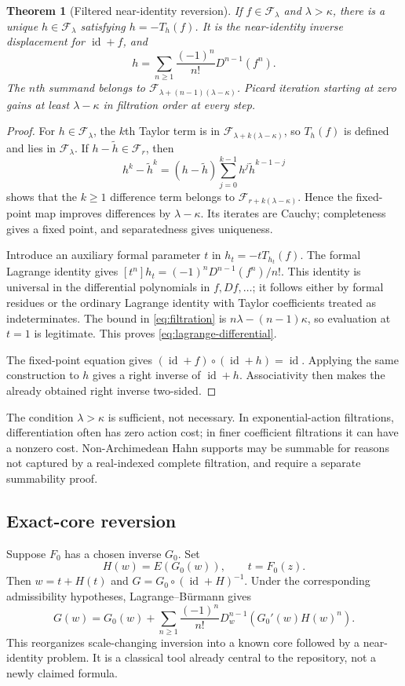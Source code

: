 \documentclass[11pt,a4paper]{article}
\numberwithin{equation}{section}
\newtheorem{theorem}{Theorem}[section]
\theoremstyle{definition}
\theoremstyle{remark}
\newcommand{\id}{\operatorname{id}}
\begin{document}
\begin{theorem}[Filtered near-identity reversion]
\label{thm:filtered}
If $f\in\mathcal F_\lambda$ and $\lambda>\kappa$, there is a unique $h\in\mathcal F_\lambda$ satisfying $h=-T_h(f)$. It is the near-identity inverse displacement for $\id+f$, and
\begin{equation}
 h=\sum_{n\geq1}\frac{(-1)^n}{n!}D^{n-1}(f^n).
 \label{eq:lagrange-differential}
\end{equation}
The $n$th summand belongs to $\mathcal F_{\lambda+(n-1)(\lambda-\kappa)}$. Picard iteration starting at zero gains at least $\lambda-\kappa$ in filtration order at every step.
\end{theorem}
\begin{proof}
For $h\in\mathcal F_\lambda$, the $k$th Taylor term is in
$\mathcal F_{\lambda+k(\lambda-\kappa)}$, so $T_h(f)$ is defined and lies in $\mathcal F_\lambda$. If $h-\widetilde h\in\mathcal F_r$, then
\[
 h^k-\widetilde h^k=(h-\widetilde h)
 \sum_{j=0}^{k-1}h^j\widetilde h^{k-1-j}
\]
shows that the $k\geq1$ difference term belongs to
$\mathcal F_{r+k(\lambda-\kappa)}$. Hence the fixed-point map improves differences by $\lambda-\kappa$. Its iterates are Cauchy; completeness gives a fixed point, and separatedness gives uniqueness.

Introduce an auxiliary formal parameter $t$ in $h_t=-tT_{h_t}(f)$. The formal Lagrange identity gives
$[t^n]h_t=(-1)^nD^{n-1}(f^n)/n!$. This identity is universal in the differential polynomials in $f,Df,\ldots$; it follows either by formal residues or the ordinary Lagrange identity with Taylor coefficients treated as indeterminates. The bound in \eqref{eq:filtration} is
$n\lambda-(n-1)\kappa$, so evaluation at $t=1$ is legitimate. This proves \eqref{eq:lagrange-differential}.

The fixed-point equation gives $(\id+f)\circ(\id+h)=\id$. Applying the same construction to $h$ gives a right inverse of $\id+h$. Associativity then makes the already obtained right inverse two-sided.
\end{proof}

The condition $\lambda>\kappa$ is sufficient, not necessary. In exponential-action filtrations, differentiation often has zero action cost; in finer coefficient filtrations it can have a nonzero cost. Non-Archimedean Hahn supports may be summable for reasons not captured by a real-indexed complete filtration, and require a separate summability proof.

\subsection{Exact-core reversion}
Suppose $F_0$ has a chosen inverse $G_0$. Set
\[
 H(w)=E(G_0(w)),\qquad t=F_0(z).
\]
Then $w=t+H(t)$ and $G=G_0\circ(\id+H)^{-1}$. Under the corresponding admissibility hypotheses, Lagrange--B\"urmann gives
\begin{equation}
 G(w)=G_0(w)+\sum_{n\geq1}\frac{(-1)^n}{n!}
 D_w^{n-1}\!\left(G_0'(w)H(w)^n\right).
 \label{eq:core-lagrange}
\end{equation}
This reorganizes scale-changing inversion into a known core followed by a near-identity problem. It is a classical tool already central to the repository, not a newly claimed formula.
\end{document}
